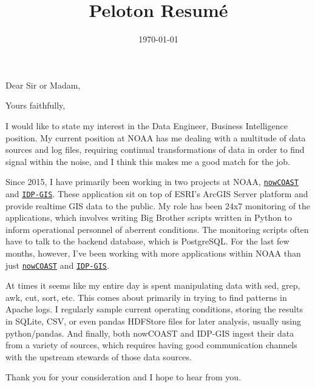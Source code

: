 \documentclass[11pt,a4paper,sans]{moderncv}        %
\title{Peloton Resumé}
\begin{document}
\date{\today}
\opening{Dear Sir or Madam,}
\closing{Yours faithfully,}
\makelettertitle

I would like to state my interest in the Data Engineer, Business Intelligence
position.  My current position at NOAA has me dealing with a multitude of
data sources and log files, requiring continual transformations of data in 
order to find signal within the noise, and I think this makes me a good match
for the job.

Since 2015, I have primarily been working in two projects at NOAA, 
\href{https://nowcoast.noaa.gov}{\texttt{nowCOAST}}
and
\href{https://idpgis.ncep.noaa.gov}{\texttt{IDP-GIS}}.
These application sit on top of ESRI's ArcGIS Server platform and provide
realtime GIS data to the public.  My role has been 24x7 monitoring of the
applications, which involves writing Big Brother scripts written in Python
to inform operational
personnel of aberrent conditions.  The monitoring scripts often have to talk
to the backend database, which is PostgreSQL.
For the last few months, however, I've been working with more applications
within NOAA than just 
\href{https://nowcoast.noaa.gov}{\texttt{nowCOAST}}
and
\href{https://idpgis.ncep.noaa.gov}{\texttt{IDP-GIS}}.

At times it seems like my entire day is spent manipulating data
with sed, grep, awk, cut, sort, etc.  This comes about primarily in trying
to find patterns in Apache logs.  I regularly sample current
operating conditions, storing the results in SQLite, CSV, or even 
pandas HDFStore files
for later analysis, usually using python/pandas.  And finally, both
nowCOAST and IDP-GIS ingest their data from a variety of sources,
which requires having good communication channels with the upstream
stewards of those data sources.

Thank you for your consideration and I hope to hear from you.


\makeletterclosing

\end{document}
